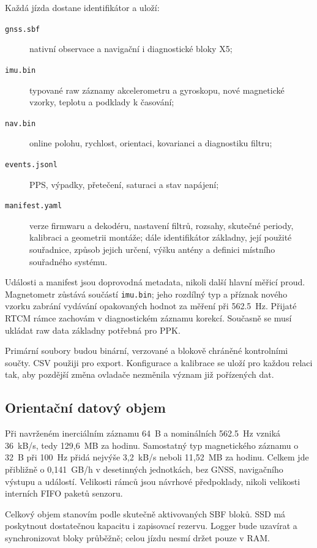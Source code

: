 Každá jízda dostane identifikátor a uloží:
\begin{description}
  \item[\texttt{gnss.sbf}] nativní observace a navigační i diagnostické bloky X5;
  \item[\texttt{imu.bin}] typované raw záznamy akcelerometru a gyroskopu,
    nové magnetické vzorky, teplotu a podklady k časování;
  \item[\texttt{nav.bin}] online polohu, rychlost, orientaci, kovarianci
    a diagnostiku filtru;
  \item[\texttt{events.jsonl}] PPS, výpadky, přetečení, saturaci a stav napájení;
  \item[\texttt{manifest.yaml}] verze firmwaru a dekodéru, nastavení filtrů,
    rozsahy, skutečné periody, kalibraci a geometrii montáže;
    dále identifikátor základny, její použité souřadnice, způsob jejich
    určení, výšku antény a definici místního souřadného systému.
\end{description}
Události a manifest jsou doprovodná metadata, nikoli další hlavní měřicí
proud. Magnetometr zůstává součástí \texttt{imu.bin}; jeho rozdílný typ a
příznak nového vzorku zabrání vydávání opakovaných hodnot za měření při
\SI{562.5}{Hz}. Přijaté RTCM rámce zachovám v diagnostickém záznamu korekcí.
Současně se musí ukládat raw data základny potřebná pro PPK.

Primární soubory budou binární, verzované a blokově chráněné kontrolními
součty. CSV použiji pro export. Konfigurace a kalibrace se uloží pro každou
relaci tak, aby pozdější změna ovladače nezměnila význam již pořízených dat.

\subsection{Orientační datový objem}

Při navrženém inerciálním záznamu 64~B a nominálních \SI{562.5}{Hz} vzniká
36~kB/s, tedy 129,6~MB za hodinu. Samostatný typ magnetického záznamu o 32~B
při \SI{100}{Hz} přidá nejvýše 3,2~kB/s neboli 11,52~MB za hodinu.
Celkem jde přibližně o 0,141~GB/h v desetinných jednotkách, bez GNSS,
navigačního výstupu a událostí. Velikosti rámců jsou návrhové předpoklady,
nikoli velikosti interních FIFO paketů senzoru.

Celkový objem stanovím podle skutečně aktivovaných SBF bloků. SSD má
poskytnout dostatečnou kapacitu i zapisovací rezervu. Logger bude uzavírat
a synchronizovat bloky průběžně; celou jízdu nesmí držet pouze v RAM.


